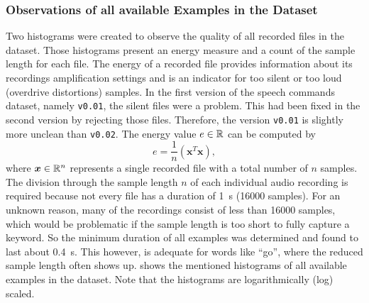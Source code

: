 \subsubsection{Observations of all available Examples in the Dataset}
Two histograms were created to observe the quality of all recorded files in the dataset.
Those histograms present an energy measure and a count of the sample length for each file.
The energy of a recorded file provides information about its recordings amplification settings and is an indicator for too silent or too loud (overdrive distortions) samples.
In the first version of the speech commands dataset, namely \texttt{v0.01}, the silent files were a problem.
This had been fixed in the second version by rejecting those files.
Therefore, the version \texttt{v0.01} is slightly more unclean than \texttt{v0.02}.
The energy value $e \in \mathbb{R}$ can be computed by
\begin{equation}\label{eq:exp_dataset_energy}
  e = \frac{1}{n} \left( \bm{x}^T \bm{x} \right),
\end{equation}
where $\bm{x} \in \mathbb{R}^n$ represents a single recorded file with a total number of $n$ samples.
The division through the sample length $n$ of each individual audio recording is required because not every file has a duration of \SI{1}{\second} (16000 samples).
For an unknown reason, many of the recordings consist of less than 16000 samples, which would be problematic if the sample length is too short to fully capture a keyword.
So the minimum duration of all examples was determined and found to last about \SI{0.4}{\second}.
This however, is adequate for words like \enquote{go}, where the reduced sample length often shows up.
 shows the mentioned histograms of all available examples in the dataset.
Note that the histograms are logarithmically (log) scaled.
